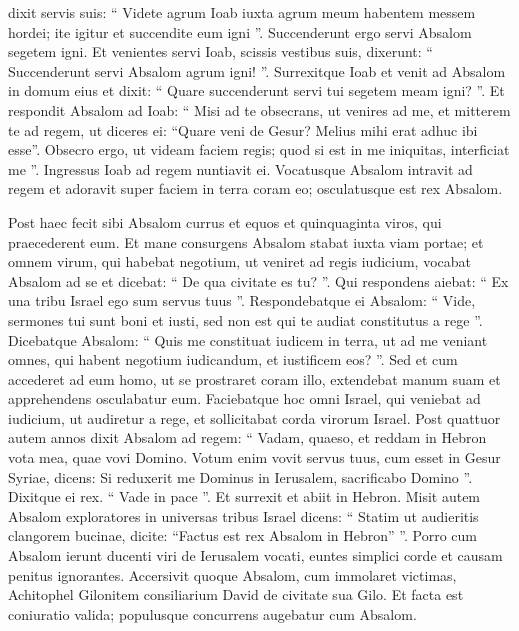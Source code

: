 \begin{biblechapter}
\begin{biblechapter}
\begin{biblechapter}
\begin{biblechapter}
\begin{biblechapter}
\begin{biblechapter}
\begin{biblechapter}
\begin{biblechapter}
\begin{biblechapter}
\begin{biblechapter}
\begin{biblechapter}
\begin{biblechapter}
\begin{biblechapter}
\begin{biblechapter}
\verse dixit servis suis: “ Videte agrum Ioab iuxta agrum meum habentem messem hordei; ite igitur et succendite eum igni ”. Succenderunt ergo servi Absalom segetem igni. Et venientes servi Ioab, scissis vestibus suis, dixerunt: “ Succenderunt servi Absalom agrum igni! ”. 
\verse Surrexitque Ioab et venit ad Absalom in domum eius et dixit: “ Quare succenderunt servi tui segetem meam igni? ”. 
\verse Et respondit Absalom ad Ioab: “ Misi ad te obsecrans, ut venires ad me, et mitterem te ad regem, ut diceres ei: “Quare veni de Gesur? Melius mihi erat adhuc ibi esse”. Obsecro ergo, ut videam faciem regis; quod si est in me iniquitas, interficiat me ”. 
 \verse Ingressus Ioab ad regem nuntiavit ei. Vocatusque Absalom intravit ad regem et adoravit super faciem in terra coram eo; osculatusque est rex Absalom.
 
\begin{biblechapter}
\verse Post haec fecit sibi Absalom currus et equos et quinquaginta viros, qui praecederent eum. 
\verse Et mane consurgens Absalom stabat iuxta viam portae; et omnem virum, qui habebat negotium, ut veniret ad regis iudicium, vocabat Absalom ad se et dicebat: “ De qua civitate es tu? ”. Qui respondens aiebat: “ Ex una tribu Israel ego sum servus tuus ”. 
\verse Respondebatque ei Absalom: “ Vide, sermones tui sunt boni et iusti, sed non est qui te audiat constitutus a rege ”. Dicebatque Absalom: 
\verse “ Quis me constituat iudicem in terra, ut ad me veniant omnes, qui habent negotium iudicandum, et iustificem eos? ”. 
\verse Sed et cum accederet ad eum homo, ut se prostraret coram illo, extendebat manum suam et apprehendens osculabatur eum. 
\verse Faciebatque hoc omni Israel, qui veniebat ad iudicium, ut audiretur a rege, et sollicitabat corda virorum Israel.
 \verse Post quattuor autem annos dixit Absalom ad regem: “ Vadam, quaeso, et reddam in Hebron vota mea, quae vovi Domino. 
\verse Votum enim vovit servus tuus, cum esset in Gesur Syriae, dicens: Si reduxerit me Dominus in Ierusalem, sacrificabo Domino ”. 
\verse Dixitque ei rex. “ Vade in pace ”. Et surrexit et abiit in Hebron.
 \verse Misit autem Absalom exploratores in universas tribus Israel dicens: “ Statim ut audieritis clangorem bucinae, dicite: “Factus est rex Absalom in Hebron” ”. 
 \verse Porro cum Absalom ierunt ducenti viri de Ierusalem vocati, euntes simplici corde et causam penitus ignorantes. 
\verse Accersivit quoque Absalom, cum immolaret victimas, Achitophel Gilonitem consiliarium David de civitate sua Gilo. Et facta est coniuratio valida; populusque concurrens augebatur cum Absalom.

\end{biblechapter}
\end{biblechapter}
\end{biblechapter}
\end{biblechapter}
\end{biblechapter}
\end{biblechapter}
\end{biblechapter}
\end{biblechapter}
\end{biblechapter}
\end{biblechapter}
\end{biblechapter}
\end{biblechapter}
\end{biblechapter}
\end{biblechapter}
\end{biblechapter}
